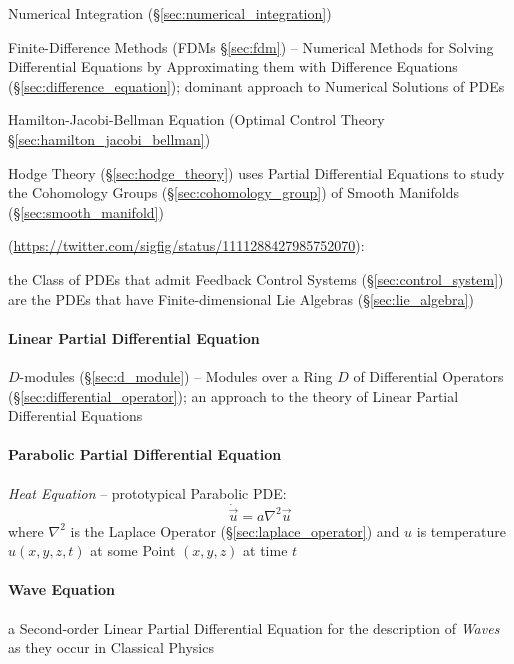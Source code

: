 \fist Numerical Integration (\S\ref{sec:numerical_integration})

\fist Finite-Difference Methods (FDMs \S\ref{sec:fdm}) -- Numerical Methods for
Solving Differential Equations by Approximating them with Difference Equations
(\S\ref{sec:difference_equation}); dominant approach to Numerical Solutions of
PDEs

\fist Hamilton-Jacobi-Bellman Equation (Optimal Control Theory
\S\ref{sec:hamilton_jacobi_bellman})

\fist Hodge Theory (\S\ref{sec:hodge_theory}) uses Partial Differential
Equations to study the Cohomology Groups (\S\ref{sec:cohomology_group}) of
Smooth Manifolds (\S\ref{sec:smooth_manifold})

(\url{https://twitter.com/sigfig/status/1111288427985752070}):

the Class of PDEs that admit Feedback Control Systems
(\S\ref{sec:control_system}) are the PDEs that have Finite-dimensional Lie
Algebras (\S\ref{sec:lie_algebra})



\paragraph{Linear Partial Differential Equation}\label{sec:linear_pde}\hfill

\fist $D$-modules (\S\ref{sec:d_module}) -- Modules over a Ring $D$ of
Differential Operators (\S\ref{sec:differential_operator}); an approach to the
theory of Linear Partial Differential Equations



\paragraph{Parabolic Partial Differential Equation}
\label{sec:parabolic_pde}\hfill

\emph{Heat Equation} -- prototypical Parabolic PDE:
\[
  \dot{\vec{u}} = a \nabla^2 \vec{u}
\]
where $\nabla^2$ is the Laplace Operator (\S\ref{sec:laplace_operator}) and $u$
is temperature $u(x,y,z,t)$ at some Point $(x,y,z)$ at time $t$



\paragraph{Wave Equation}\label{sec:wave_equation}\hfill

a Second-order Linear Partial Differential Equation for the description of
\emph{Waves} as they occur in Classical Physics

